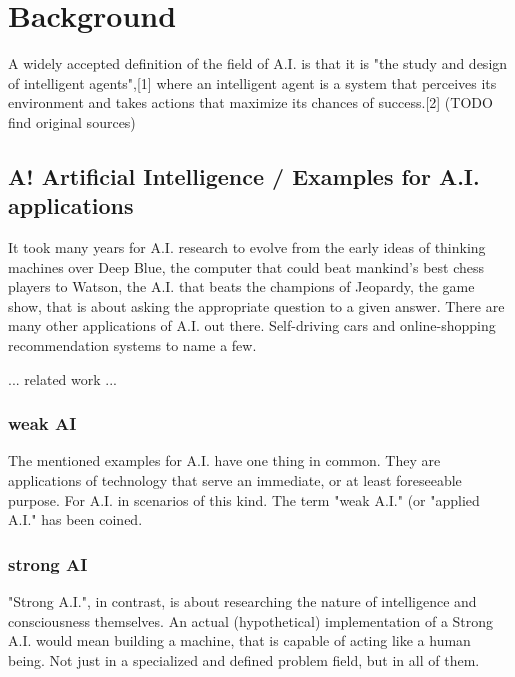 \chapter{Background}

A widely accepted definition of the field of A.I. is that it is "the study and design of intelligent agents",[1] where an intelligent agent is a system that perceives its environment and takes actions that maximize its chances of success.[2] (TODO find original sources)

\section{A! Artificial Intelligence / Examples for A.I. applications}
It took many years for A.I. research to evolve from the early ideas of thinking machines over Deep Blue, the computer that could beat mankind's best chess players to Watson, the A.I. that beats the champions of Jeopardy, the game show, that is about asking the appropriate question to a given answer. There are many other applications of A.I. out there. Self-driving cars and online-shopping recommendation systems to name a few.

... related work ...

\subsection{weak AI}
The mentioned examples for A.I. have one thing in common. They are applications of technology that serve an immediate, or at least foreseeable purpose. For A.I. in scenarios of this kind. The term "weak A.I." (or "applied A.I." has been coined.

\subsection{strong AI}
"Strong A.I.", in contrast, is about researching the nature of intelligence and consciousness themselves. An actual (hypothetical) implementation of a Strong A.I. would mean building a machine, that is capable of acting like a human being. Not just in a specialized and defined problem field, but in all of them.

